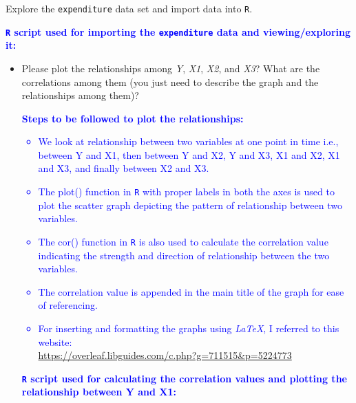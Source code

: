 \documentclass[12pt,letterpaper]{article}
\begin{document}
\vspace{.25cm}


\noindent Explore the \texttt{expenditure} data set and import data into \texttt{R}.
\vspace{.5cm}

\textcolor{blue}{
	\noindent \textbf{\texttt{R} script used for importing the \texttt{expenditure} data and viewing/exploring it:}
}

  

\vspace{.25cm}

\begin{itemize}

\item
Please plot the relationships among \emph{Y}, \emph{X1}, \emph{X2}, and \emph{X3}? What are the correlations among them (you just need to describe the graph and the relationships among them)?

\textcolor{blue}{
	\textbf{Steps to be followed to plot the relationships:}
	\begin{itemize}
		\item We look at relationship between two variables at one point in time i.e., between Y and X1, then between Y and X2, Y and X3, X1 and X2, X1 and X3, and finally between X2 and X3.
		\item The plot() function in \texttt{R} with proper labels in both the axes is used to plot the scatter graph depicting the pattern of relationship between two variables.
		\item The cor() function in \texttt{R} is also used to calculate the correlation value indicating the strength and direction of relationship between the two variables.
		\item The correlation value is appended in the main title of the graph for ease of referencing.
		\item For inserting and formatting the graphs using \emph{LaTeX}, I referred to this website:\\\url{https://overleaf.libguides.com/c.php?g=711515&p=5224773}
\end{itemize}
}

\pagebreak

\textcolor{blue}{
	\noindent \textbf{\texttt{R} script used for calculating the correlation values and plotting the relationship between Y and X1:}
}




\end{itemize}
\end{document}
